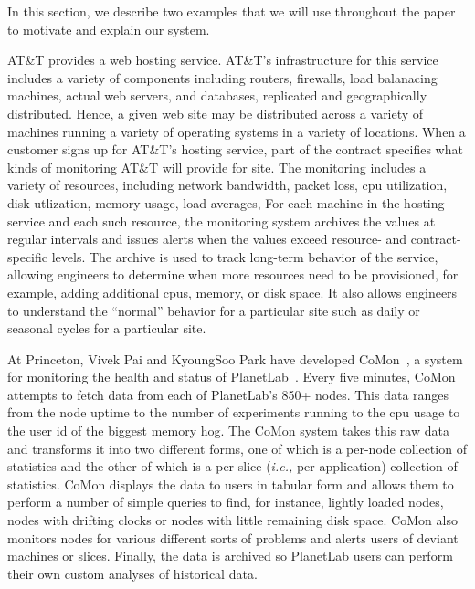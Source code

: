 In this section, we describe two examples that we will use throughout
the paper to motivate and explain our system.

AT\&T provides a web hosting service.  AT\&T's infrastructure for this
service includes a variety of components including routers, firewalls,
load balanacing machines, actual web servers, and databases,
replicated and geographically distributed.  Hence, a given web site
may be distributed across a variety of machines running a variety of
operating systems in a variety of locations.  When a customer signs up
for AT\&T's hosting service, part of the contract specifies what kinds
of monitoring AT\&T will provide for site.  The monitoring includes a
variety of resources, including network bandwidth, packet loss, cpu
utilization, disk utlization, memory usage, load averages, \etc{} For
each machine in the hosting service and each such resource, the
monitoring system archives the values at regular intervals and issues
alerts when the values exceed resource- and contract-specific levels.
The archive is used to track long-term behavior of the service,
allowing engineers to determine when more resources need to be
provisioned, for example, adding additional cpus, memory, or disk
space.  It also allows engineers to understand the ``normal'' behavior
for a particular site such as daily or seasonal cycles for a
particular site. 

At Princeton, Vivek Pai and KyoungSoo Park have developed
CoMon~\cite{comon}, a system for monitoring the health and status of
PlanetLab~\cite{planetlab}.  Every five minutes, CoMon attempts to
fetch data from each of PlanetLab's 850+ nodes.  This data ranges from
the node uptime to the number of experiments running to the cpu usage
to the user id of the biggest memory hog.  The CoMon system takes this
raw data and transforms it into two different forms, one of which is a
per-node collection of statistics and the other of which is a
per-slice ({\em i.e.,} per-application) collection of statistics.
CoMon displays the data to users in tabular form and allows them to
perform a number of simple queries to find, for instance, lightly
loaded nodes, nodes with drifting clocks or nodes with little
remaining disk space.  CoMon also monitors nodes for various different
sorts of problems and alerts users of deviant machines or slices.
Finally, the data is archived so PlanetLab users can perform their own
custom analyses of historical data.



